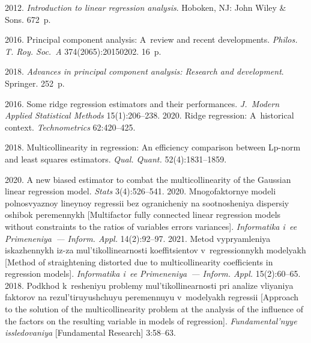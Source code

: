   \begin{multicols}{2}

\renewcommand{\bibname}{\protect\rmfamily References}

{\small\frenchspacing
 {%
 \begin{thebibliography}{99}
 2012. \textit{Introduction to linear regression 
analysis}. Hoboken, NJ: John Wiley \& Sons. 672~p.

 2016. Principal component analysis: A~review and recent 
developments. \textit{Philos. T. Roy. Soc.~A} 374(2065):20150202. 16~p.

 2018. \textit{Advances in principal component analysis: Research and development}. 
Springer. 252~p.

 2016. Some ridge regression estimators and their performances. 
\textit{J.~Modern Applied Statistical Methods} 15(1):206--238.
 2020. Ridge regression: A~historical context. \textit{Technometrics} 62:420--425.

 2018. Multicollinearity in regression: An efficiency 
comparison between Lp-norm and least squares estimators. \textit{Qual. Quant.} 52(4):1831--1859.

 2020. A new biased estimator to combat the multicollinearity of 
the Gaussian linear regression model. \textit{Stats} 3(4):526--541. 
 2020. Mnogofaktornye modeli polnosvyaznoy lineynoy regressii bez 
ogranicheniy na sootnosheniya dispersiy oshibok peremennykh [Multifactor fully connected linear 
regression models without constraints to the ratios of variables errors variances]. \textit{Informatika i~ee 
Primeneniya~--- Inform. Appl.} 14(2):92--97.
 2021. Metod vypryamleniya iskazhennykh iz-za mul'tikollinearnosti 
koeffitsientov v~regressionnykh modelyakh [Method of straightening distorted due to multicollinearity 
coefficients in regression models]. \textit{Informatika i~ee Primeneniya~--- Inform. Appl.} 15(2):60--65.
 2018. Podkhod k~resheniyu problemy mul'tikollinearnosti pri analize vliyaniya 
faktorov na rezul'tiruyushchuyu peremennuyu v~modelyakh regressii [Approach to the solution of the 
multicollinearity problem at the analysis of the influence of the factors on the resulting variable in models of 
regression]. \textit{Fundamental'nyye issledovaniya} [Fundamental Research] 3:58--63.
\end{thebibliography}

 }
 }

\end{multicols}

